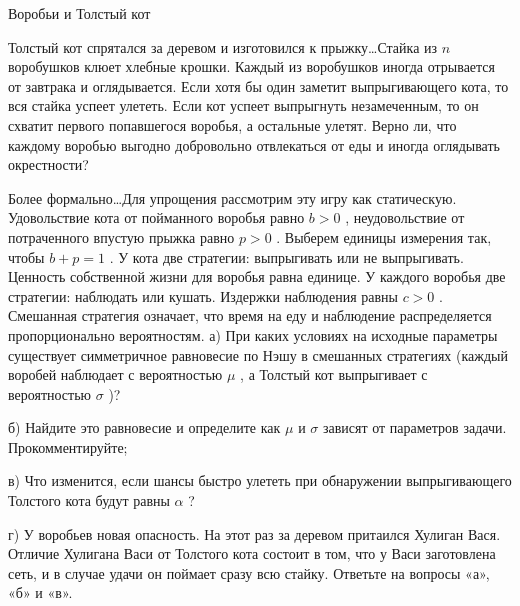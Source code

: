\begin{problem}
 Воробьи и Толстый кот\par
Толстый кот спрятался за деревом и изготовился к прыжку\ldots Стайка из  $n$  воробушков клюет хлебные крошки. Каждый из воробушков иногда отрывается от завтрака и оглядывается. Если хотя бы один заметит выпрыгивающего кота, то вся стайка успеет улететь. Если кот успеет выпрыгнуть незамеченным, то он схватит первого попавшегося воробья, а остальные улетят. Верно ли, что каждому воробью выгодно добровольно отвлекаться от еды и иногда оглядывать окрестности?\par
Более формально\ldots Для упрощения рассмотрим эту игру как статическую. Удовольствие кота от пойманного воробья равно  $b>0$ , неудовольствие от потраченного впустую прыжка равно  $p>0$ . Выберем единицы измерения так, чтобы  $b+p=1$ . У кота две стратегии: выпрыгивать или не выпрыгивать.
Ценность собственной жизни для воробья равна единице. У каждого воробья две стратегии: наблюдать или кушать. Издержки наблюдения равны  $c>0$ . Смешанная стратегия означает, что время на еду и наблюдение распределяется пропорционально вероятностям.
а)  При каких условиях на исходные параметры существует симметричное равновесие по Нэшу в смешанных стратегиях (каждый воробей наблюдает с вероятностью  $\mu $ , а Толстый кот выпрыгивает с вероятностью  $\sigma $ )?\par
б) Найдите это равновесие и определите как  $\mu $  и  $\sigma $  зависят от параметров задачи. Прокомментируйте;\par
в) Что изменится, если шансы быстро улететь при обнаружении выпрыгивающего Толстого кота будут равны  $\alpha$ ?\par
г) У воробьев новая опасность. На этот раз за деревом притаился Хулиган Вася. Отличие Хулигана Васи от Толстого кота состоит в том, что у Васи заготовлена сеть, и в случае удачи он поймает сразу всю стайку. Ответьте на вопросы «а», «б» и «в».



\begin{sol}

\end{sol}
\end{problem}



